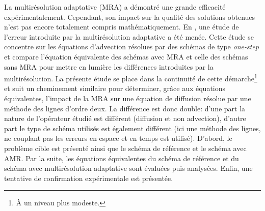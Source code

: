 La multirésolution adaptative (MRA) a démontré une grande efficacité expérimentalement.\label{par:intro_contrib_eq_equiv}
Cependant, son impact sur la qualité des solutions obtenues n'est pas encore totalement compris mathématiquement.
En \cite{belloti_et_al_2025}, une étude de l'erreur introduite par la multirésolution adaptative a été menée.
Cette étude se concentre sur les équations d'advection résolues par des schémas de type \textit{one-step} \cite{DARU2004563} et
compare l'équation équivalente des schémas avec MRA et celle des schémas sans MRA pour mettre en lumière les différences introduites par la multirésolution.
La présente étude se place dans la continuité de cette démarche\footnote{À un niveau plus modeste.} et suit un cheminement similaire
pour déterminer, grâce aux équations équivalentes, l'impact de la MRA sur une équation de diffusion résolue par une méthode des lignes d'ordre deux.
La différence est donc double: d'une part la nature de l'opérateur étudié est différent (diffusion et non advection), d'autre part le type de schéma 
utilisés est également différent (ici une méthode des lignes, ne couplant pas les erreurs en espace et en temps est utilisé).
D'abord, le problème cible est présenté ainsi que le schéma de référence et le schéma avec AMR.
Par la suite, les équations équivalentes du schéma de référence et du schéma avec multirésolution adaptative sont évaluées puis analysées.
Enfin, une tentative de confirmation expérimentale est présentée.